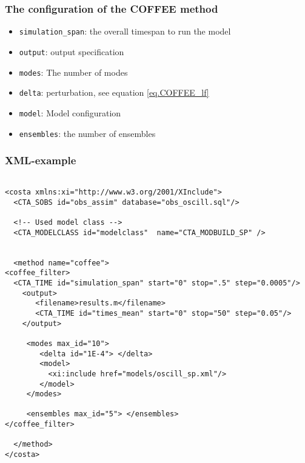 \documentclass[a4paper,12pt]{article}
\begin{document}
\subsubsection{The configuration of the COFFEE method}
\begin{itemize}

\item {\tt simulation\_span}: the overall timespan to run the model
\item {\tt output}: output specification
\item {\tt modes}: The number of modes
\item {\tt delta}: perturbation, see equation \ref{eq.COFFEE_lf}
\item {\tt model}: Model configuration
\item {\tt ensembles}: the number of ensembles
\end{itemize}

\subsubsection{XML-example}

\begin{verbatim}

<costa xmlns:xi="http://www.w3.org/2001/XInclude">
  <CTA_SOBS id="obs_assim" database="obs_oscill.sql"/>

  <!-- Used model class -->
  <CTA_MODELCLASS id="modelclass"  name="CTA_MODBUILD_SP" />


  <method name="coffee"> 
<coffee_filter>
  <CTA_TIME id="simulation_span" start="0" stop=".5" step="0.0005"/>
    <output>
       <filename>results.m</filename>
       <CTA_TIME id="times_mean" start="0" stop="50" step="0.05"/>
    </output>

     <modes max_id="10">
        <delta id="1E-4"> </delta>
        <model>
          <xi:include href="models/oscill_sp.xml"/>
        </model>        
     </modes>

     <ensembles max_id="5"> </ensembles>
</coffee_filter>
  
  </method> 
</costa>
\end{verbatim}


% 
% 
\end{document}
